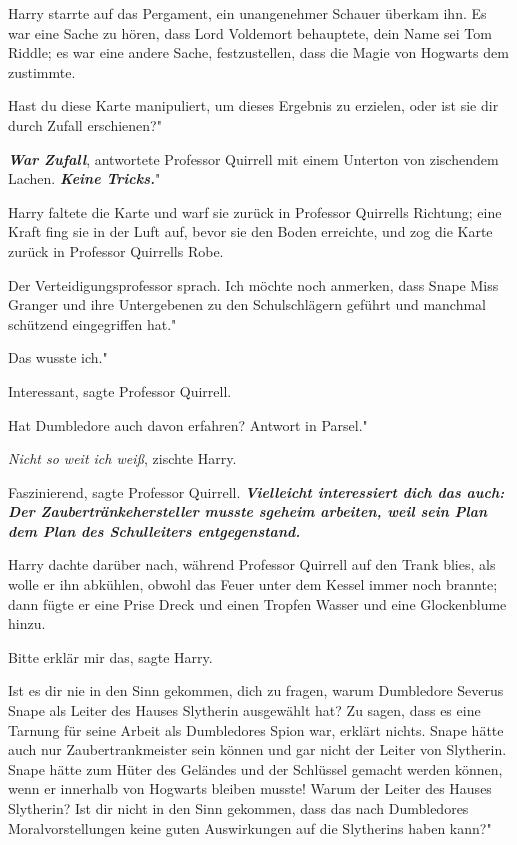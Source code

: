 Harry starrte auf das Pergament, ein unangenehmer Schauer überkam ihn. Es war
eine Sache zu hören, dass Lord Voldemort behauptete, dein Name sei Tom Riddle;
es war eine andere Sache, festzustellen, dass die Magie von Hogwarts dem
zustimmte.

\glqq Hast du diese Karte manipuliert, um dieses Ergebnis zu erzielen, oder ist
sie dir durch Zufall erschienen?"

\glqq \textbf{\emph{War Zufall}}\grqq{}, antwortete Professor Quirrell mit einem
Unterton von zischendem Lachen. \glqq \textbf{\emph{Keine Tricks.}}"

Harry faltete die Karte und warf sie zurück in Professor Quirrells Richtung;
eine Kraft fing sie in der Luft auf, bevor sie den Boden erreichte, und zog die
Karte zurück in Professor Quirrells Robe.

Der Verteidigungsprofessor sprach. \glqq Ich möchte noch anmerken, dass Snape
Miss Granger und ihre Untergebenen zu den Schulschlägern geführt und manchmal
schützend eingegriffen hat."

\glqq Das wusste ich."

\glqq Interessant\grqq{}, sagte Professor Quirrell.

\glqq Hat Dumbledore auch davon erfahren? Antwort in Parsel."

\glqq \emph{Nicht so weit ich weiß}\grqq{}, zischte Harry.

\glqq Faszinierend\grqq{}, sagte Professor Quirrell. \glqq
\textbf{\emph{Vielleicht interessiert dich das auch: Der Zaubertränkehersteller
musste sgeheim arbeiten, weil sein Plan dem Plan des Schulleiters
entgegenstand.\grqq{} }}

Harry dachte darüber nach, während Professor Quirrell auf den Trank blies, als
wolle er ihn abkühlen, obwohl das Feuer unter dem Kessel immer noch brannte;
dann fügte er eine Prise Dreck und einen Tropfen Wasser und eine Glockenblume
hinzu.

\glqq Bitte erklär mir das\grqq{}, sagte Harry.

\glqq Ist es dir nie in den Sinn gekommen, dich zu fragen, warum Dumbledore
Severus Snape als Leiter des Hauses Slytherin ausgewählt hat? Zu sagen, dass es
eine Tarnung für seine Arbeit als Dumbledores Spion war, erklärt nichts. Snape
hätte auch nur Zaubertrankmeister sein können und gar nicht der Leiter von
Slytherin. Snape hätte zum Hüter des Geländes und der Schlüssel gemacht werden
können, wenn er innerhalb von Hogwarts bleiben musste! Warum der Leiter des
Hauses Slytherin? Ist dir nicht in den Sinn gekommen, dass das nach Dumbledores
Moralvorstellungen keine guten Auswirkungen auf die Slytherins haben kann?"

